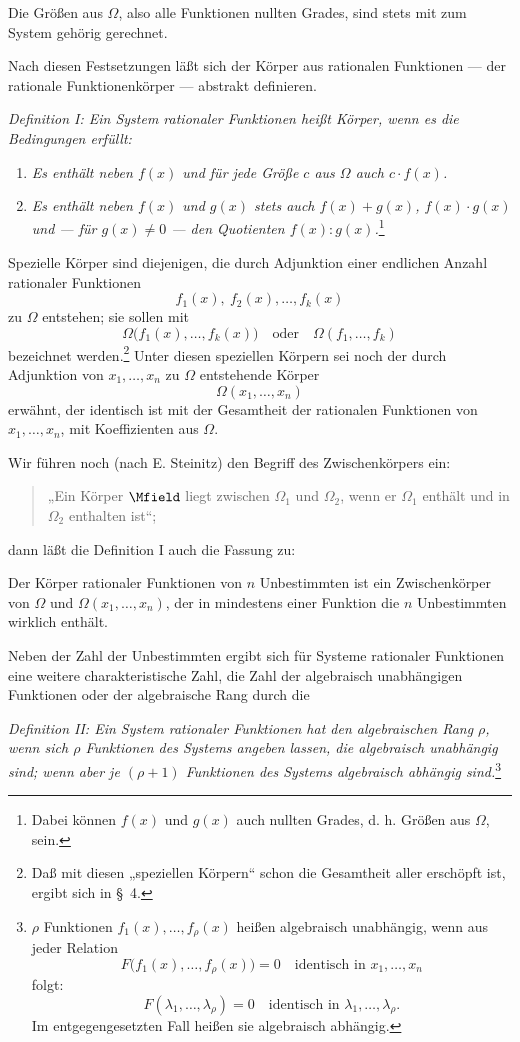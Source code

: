 \documentclass[11pt]{article}
\begin{document}
Die Größen aus $\Omega$, also alle Funktionen nullten Grades, sind stets mit zum System gehörig gerechnet.

Nach diesen Festsetzungen läßt sich der Körper aus rationalen Funktionen --- der rationale Funktionenkörper --- abstrakt definieren.

\emph{Definition I: Ein System rationaler Funktionen heißt Körper, wenn es die Bedingungen erfüllt:}
\begin{enumerate}
\item \emph{Es enthält neben $f(x)$ und für jede Größe $c$ aus $\Omega$ auch $c\cdot f(x)$.}
\item \emph{Es enthält neben $f(x)$ und $g(x)$ stets auch $f(x)+g(x)$, $f(x)\cdot g(x)$ und --- für $g(x)\ne0$ --- den Quotienten $f(x):g(x)$.}\footnote{Dabei können $f(x)$ und $g(x)$ auch nullten Grades, d. h. Größen aus $\Omega$, sein.}
\end{enumerate}
Spezielle Körper sind diejenigen, die durch Adjunktion einer endlichen Anzahl rationaler Funktionen
\[
  f_1(x),\ f_2(x),\ldots, f_k(x)
\]
zu $\Omega$ entstehen; sie sollen mit
\[
  \Omega\bigl(f_1(x),\ldots,f_k(x)\bigr)
  \quad\text{oder}\quad
  \Omega(f_1,\ldots,f_k)
\]
bezeichnet werden.\footnote{Daß mit diesen „speziellen Körpern“ schon die Gesamtheit aller erschöpft ist, ergibt sich in \S\ 4.} Unter diesen speziellen Körpern sei noch der durch Adjunktion von $x_1,\ldots,x_n$ zu $\Omega$ entstehende Körper
\[
  \Omega(x_1,\ldots,x_n)
\]
erwähnt, der identisch ist mit der Gesamtheit der rationalen Funktionen von $x_1,\ldots,x_n$, mit Koeffizienten aus $\Omega$.

Wir führen noch (nach E. Steinitz) den Begriff des Zwischenkörpers ein:
\begin{quote}
„Ein Körper $\Mfield$ liegt zwischen $\Omega_1$ und $\Omega_2$, wenn er $\Omega_1$ enthält und in $\Omega_2$ enthalten ist“;
\end{quote}
dann läßt die Definition I auch die Fassung zu:

Der Körper rationaler Funktionen von $n$ Unbestimmten ist ein Zwischenkörper von $\Omega$ und $\Omega(x_1,\ldots,x_n)$, der in mindestens einer Funktion die $n$ Unbestimmten wirklich enthält.

Neben der Zahl der Unbestimmten ergibt sich für Systeme rationaler Funktionen eine weitere charakteristische Zahl, die Zahl der algebraisch unabhängigen Funktionen oder der algebraische Rang durch die

\emph{Definition II: Ein System rationaler Funktionen hat den algebraischen Rang $\rho$, wenn sich $\rho$ Funktionen des Systems angeben lassen, die algebraisch unabhängig sind; wenn aber je $(\rho+1)$ Funktionen des Systems algebraisch abhängig sind.}\footnote{$\rho$ Funktionen $f_1(x),\ldots,f_\rho(x)$ heißen algebraisch unabhängig, wenn aus jeder Relation
\[
F\bigl(f_1(x),\ldots,f_\rho(x)\bigr)=0\quad\text{identisch in }x_1,\ldots,x_n
\]
folgt:
\[
F(\lambda_1,\ldots,\lambda_\rho)=0\quad\text{identisch in }\lambda_1,\ldots,\lambda_\rho.
\]
Im entgegengesetzten Fall heißen sie algebraisch abhängig.}
\end{document}
